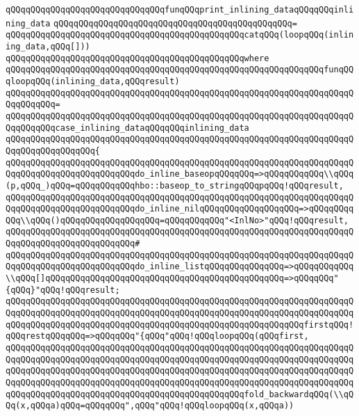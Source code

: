 \newline
\verb|qQQqqQQqqQQqqQQqqQQqqQQqqQQqqQQqfunqQQqprint_inlining_dataqQQqqQQqinlining_data|\newline
\verb|qQQqqQQqqQQqqQQqqQQqqQQqqQQqqQQqqQQqqQQqqQQqqQQq=|\newline
\verb|qQQqqQQqqQQqqQQqqQQqqQQqqQQqqQQqqQQqqQQqqQQqqQQqcatqQQq(loopqQQq(inlining_data,qQQq[]))|\newline
\verb|qQQqqQQqqQQqqQQqqQQqqQQqqQQqqQQqqQQqqQQqqQQqqQQqwhere|\newline
\verb|qQQqqQQqqQQqqQQqqQQqqQQqqQQqqQQqqQQqqQQqqQQqqQQqqQQqqQQqqQQqqQQqfunqQQqloopqQQq(inlining_data,qQQqresult)|\newline
\verb|qQQqqQQqqQQqqQQqqQQqqQQqqQQqqQQqqQQqqQQqqQQqqQQqqQQqqQQqqQQqqQQqqQQqqQQqqQQqqQQq=|\newline
\verb|qQQqqQQqqQQqqQQqqQQqqQQqqQQqqQQqqQQqqQQqqQQqqQQqqQQqqQQqqQQqqQQqqQQqqQQqqQQqqQQqcase_inlining_dataqQQqqQQqinlining_data|\newline
\verb|qQQqqQQqqQQqqQQqqQQqqQQqqQQqqQQqqQQqqQQqqQQqqQQqqQQqqQQqqQQqqQQqqQQqqQQqqQQqqQQqqQQqqQQq{|\newline
\verb|qQQqqQQqqQQqqQQqqQQqqQQqqQQqqQQqqQQqqQQqqQQqqQQqqQQqqQQqqQQqqQQqqQQqqQQqqQQqqQQqqQQqqQQqqQQqqQQqdo_inline_baseopqQQqqQQq=>qQQqqQQqqQQq\\qQQq(p,qQQq_)qQQq=qQQqqQQqqQQqhbo::baseop_to_stringqQQqpqQQq!qQQqresult,|\newline
\verb|qQQqqQQqqQQqqQQqqQQqqQQqqQQqqQQqqQQqqQQqqQQqqQQqqQQqqQQqqQQqqQQqqQQqqQQqqQQqqQQqqQQqqQQqqQQqqQQqdo_inline_nilqQQqqQQqqQQqqQQqqQQq=>qQQqqQQqqQQq\\qQQq()qQQqqQQqqQQqqQQqqQQq=qQQqqQQqqQQq"<InlNo>"qQQq!qQQqresult,|\newline
\verb|qQQqqQQqqQQqqQQqqQQqqQQqqQQqqQQqqQQqqQQqqQQqqQQqqQQqqQQqqQQqqQQqqQQqqQQqqQQqqQQqqQQqqQQqqQQqqQQq#|\newline
\verb|qQQqqQQqqQQqqQQqqQQqqQQqqQQqqQQqqQQqqQQqqQQqqQQqqQQqqQQqqQQqqQQqqQQqqQQqqQQqqQQqqQQqqQQqqQQqqQQqdo_inline_listqQQqqQQqqQQqqQQq=>qQQqqQQqqQQq\\qQQq[]qQQqqQQqqQQqqQQqqQQqqQQqqQQqqQQqqQQqqQQqqQQqqQQq=>qQQqqQQq"{qQQq}"qQQq!qQQqresult;|\newline
\verb|qQQqqQQqqQQqqQQqqQQqqQQqqQQqqQQqqQQqqQQqqQQqqQQqqQQqqQQqqQQqqQQqqQQqqQQqqQQqqQQqqQQqqQQqqQQqqQQqqQQqqQQqqQQqqQQqqQQqqQQqqQQqqQQqqQQqqQQqqQQqqQQqqQQqqQQqqQQqqQQqqQQqqQQqqQQqqQQqqQQqqQQqqQQqqQQqqQQqqQQqfirstqQQq!qQQqrestqQQqqQQq=>qQQqqQQq"{qQQq"qQQq!qQQqloopqQQq(qQQqfirst,|\newline
\verb|qQQqqQQqqQQqqQQqqQQqqQQqqQQqqQQqqQQqqQQqqQQqqQQqqQQqqQQqqQQqqQQqqQQqqQQqqQQqqQQqqQQqqQQqqQQqqQQqqQQqqQQqqQQqqQQqqQQqqQQqqQQqqQQqqQQqqQQqqQQqqQQqqQQqqQQqqQQqqQQqqQQqqQQqqQQqqQQqqQQqqQQqqQQqqQQqqQQqqQQqqQQqqQQqqQQqqQQqqQQqqQQqqQQqqQQqqQQqqQQqqQQqqQQqqQQqqQQqqQQqqQQqqQQqqQQqqQQqqQQqqQQqqQQqqQQqqQQqqQQqqQQqqQQqqQQqqQQqqQQqqQQqqQQqfold_backwardqQQq(\\qQQq(x,qQQqa)qQQq=qQQqqQQq",qQQq"qQQq!qQQqloopqQQq(x,qQQqa))|\newline
